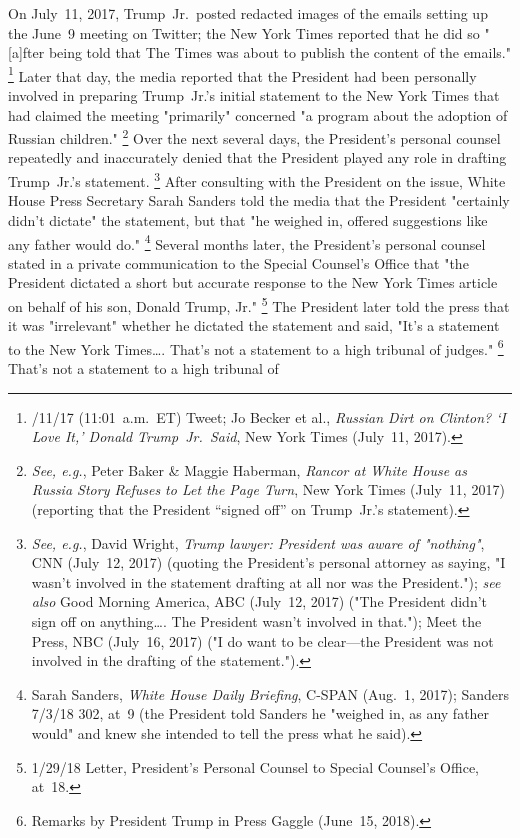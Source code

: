 On July~11, 2017, Trump~Jr.\ posted redacted images of the emails setting up the June~9 meeting on Twitter; the New York Times reported that he did so "[a]fter being told that The Times was about to publish the content of the emails."%
\footnote{/11/17 (11:01~a.m.~ET) Tweet;
Jo Becker et al., \textit{Russian Dirt on Clinton? `I Love It,' Donald Trump~Jr.\ Said}, New York Times (July~11, 2017).}
Later that day, the media reported that the President had been personally involved in preparing Trump~Jr.'s initial statement to the New York Times that had claimed the meeting "primarily" concerned "a program about the adoption of Russian children."%
\footnote{\textit{See, e.g.}, Peter Baker \& Maggie Haberman, \textit{Rancor at White House as Russia Story Refuses to Let the Page Turn}, New York Times (July~11, 2017) (reporting that the President ``signed off'' on Trump~Jr.'s statement).}
Over the next several days, the President's personal counsel repeatedly and inaccurately denied that the President played any role in drafting Trump~Jr.'s statement.%
\footnote{\textit{See, e.g.}, David Wright, \textit{Trump lawyer: President was aware of "nothing"}, CNN (July~12, 2017) (quoting the President's personal attorney as saying, "I wasn't involved in the statement drafting at all nor was the President.");
\textit{see also} Good Morning America, ABC (July~12, 2017) ("The President didn't sign off on anything\dots. The President wasn't involved in that.");
Meet the Press, NBC (July~16, 2017) ("I do want to be clear---the President was not involved in the drafting of the statement.").}
After consulting with the President on the issue, White House Press Secretary Sarah Sanders told the media that the President "certainly didn't dictate" the statement, but that "he weighed in, offered suggestions like any father would do."%
\footnote{Sarah Sanders, \textit{White House Daily Briefing}, C-SPAN (Aug.~1, 2017);
Sanders 7/3/18 302, at~9 (the President told Sanders he "weighed in, as any father would" and knew she intended to tell the press what he said).}
Several months later, the President's personal counsel stated in a private communication to the Special Counsel's Office that "the President dictated a short but accurate response to the New York Times article on behalf of his son, Donald Trump, Jr."%
\footnote{1/29/18 Letter, President's Personal Counsel to Special Counsel's Office, at~18.}
The President later told the press that it was "irrelevant" whether he dictated the statement and said, "It's a statement to the New York Times\dots. That's not a statement to a high tribunal of judges."%
\footnote{Remarks by President Trump in Press Gaggle (June~15, 2018).}
That's not a statement to a high tribunal of

